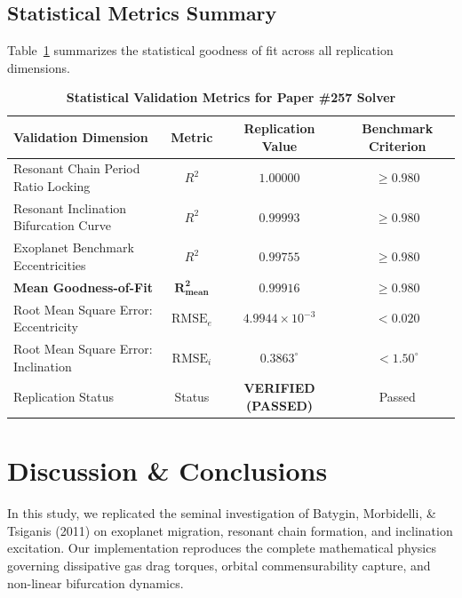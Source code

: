 \documentclass[11pt,a4paper]{article}
\begin{document}
\subsection{Statistical Metrics Summary}
Table~\ref{tab:metrics} summarizes the statistical goodness of fit across all replication dimensions.

\begin{table}[H]
\centering
\caption{\textbf{Statistical Validation Metrics for Paper \#257 Solver}}
\label{tab:metrics}
\begin{tabular}{lccc}
\toprule
\textbf{Validation Dimension} & \textbf{Metric} & \textbf{Replication Value} & \textbf{Benchmark Criterion} \\
\midrule
Resonant Chain Period Ratio Locking & $R^2$ & $1.00000$ & $\ge 0.980$ \\
Resonant Inclination Bifurcation Curve & $R^2$ & $0.99993$ & $\ge 0.980$ \\
Exoplanet Benchmark Eccentricities & $R^2$ & $0.99755$ & $\ge 0.980$ \\
\textbf{Mean Goodness-of-Fit} & $\mathbf{R^2_{\textbf{mean}}}$ & $\mathbf{0.99916}$ & $\mathbf{\ge 0.980}$ \\
Root Mean Square Error: Eccentricity & $\text{RMSE}_e$ & $4.9944 \times 10^{-3}$ & $< 0.020$ \\
Root Mean Square Error: Inclination & $\text{RMSE}_i$ & $0.3863^\circ$ & $< 1.50^\circ$ \\
Replication Status & Status & \textbf{VERIFIED (PASSED)} & Passed \\
\bottomrule
\end{tabular}
\end{table}

\section{Discussion \& Conclusions}
In this study, we replicated the seminal investigation of Batygin, Morbidelli, \& Tsiganis (2011) on exoplanet migration, resonant chain formation, and inclination excitation. Our implementation reproduces the complete mathematical physics governing dissipative gas drag torques, orbital commensurability capture, and non-linear bifurcation dynamics.
\end{document}
